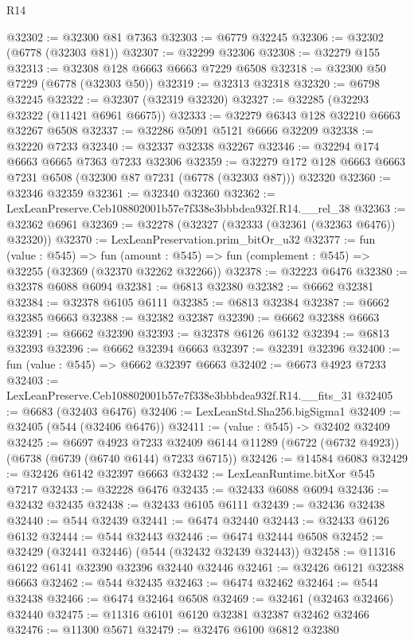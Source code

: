 \begin{lexlean}{R14}
\begin{coremodule}
@32302 := @32300 @81 @7363
@32303 := @6779 @32245
@32306 := @32302 (@6778 (@32303 @81))
@32307 := @32299 @32306
@32308 := @32279 @155
@32313 := @32308 @128 @6663 @6663 @7229 @6508
@32318 := @32300 @50 @7229 (@6778 (@32303 @50))
@32319 := @32313 @32318
@32320 := @6798 @32245
@32322 := @32307 (@32319 @32320)
@32327 := @32285 (@32293 @32322 (@11421 @6961 @6675))
@32333 := @32279 @6343 @128 @32210 @6663 @32267 @6508
@32337 := @32286 @5091 @5121 @6666 @32209
@32338 := @32220 @7233
@32340 := @32337 @32338 @32267
@32346 := @32294 @174 @6663 @6665 @7363 @7233 @32306
@32359 := @32279 @172 @128 @6663 @6663 @7231 @6508 (@32300 @87 @7231 (@6778 (@32303 @87))) @32320
@32360 := @32346 @32359
@32361 := @32340 @32360
@32362 := LexLeanPreserve.Ceb108802001b57e7f338e3bbbdea932f.R14.__rel_38
@32363 := @32362 @6961
@32369 := @32278 (@32327 (@32333 (@32361 (@32363 @6476)) @32320))
@32370 := LexLeanPreservation.prim_bitOr_u32
@32377 := fun (value : @545) =>
  fun (amount : @545) => fun (complement : @545) => @32255 (@32369 (@32370 @32262 @32266))
@32378 := @32223 @6476
@32380 := @32378 @6088 @6094
@32381 := @6813 @32380
@32382 := @6662 @32381
@32384 := @32378 @6105 @6111
@32385 := @6813 @32384
@32387 := @6662 @32385 @6663
@32388 := @32382 @32387
@32390 := @6662 @32388 @6663
@32391 := @6662 @32390
@32393 := @32378 @6126 @6132
@32394 := @6813 @32393
@32396 := @6662 @32394 @6663
@32397 := @32391 @32396
@32400 := fun (value : @545) => @6662 @32397 @6663
@32402 := @6673 @4923 @7233
@32403 := LexLeanPreserve.Ceb108802001b57e7f338e3bbbdea932f.R14.__fits_31
@32405 := @6683 (@32403 @6476)
@32406 := LexLeanStd.Sha256.bigSigma1
@32409 := @32405 (@544 (@32406 @6476))
@32411 := (value : @545) -> @32402 @32409
@32425 := @6697
    @4923
    @7233
    @32409
    @6144
    @11289
    (@6722 (@6732 @4923))
    (@6738 (@6739 (@6740 @6144) @7233 @6715))
@32426 := @14584 @6083
@32429 := @32426 @6142 @32397 @6663
@32432 := LexLeanRuntime.bitXor @545 @7217
@32433 := @32228 @6476
@32435 := @32433 @6088 @6094
@32436 := @32432 @32435
@32438 := @32433 @6105 @6111
@32439 := @32436 @32438
@32440 := @544 @32439
@32441 := @6474 @32440
@32443 := @32433 @6126 @6132
@32444 := @544 @32443
@32446 := @6474 @32444 @6508
@32452 := @32429 (@32441 @32446) (@544 (@32432 @32439 @32443))
@32458 := @11316 @6122 @6141 @32390 @32396 @32440 @32446
@32461 := @32426 @6121 @32388 @6663
@32462 := @544 @32435
@32463 := @6474 @32462
@32464 := @544 @32438
@32466 := @6474 @32464 @6508
@32469 := @32461 (@32463 @32466) @32440
@32475 := @11316 @6101 @6120 @32381 @32387 @32462 @32466
@32476 := @11300 @5671
@32479 := @32476 @6100 @6812 @32380

\end{coremodule}
\end{lexlean}
